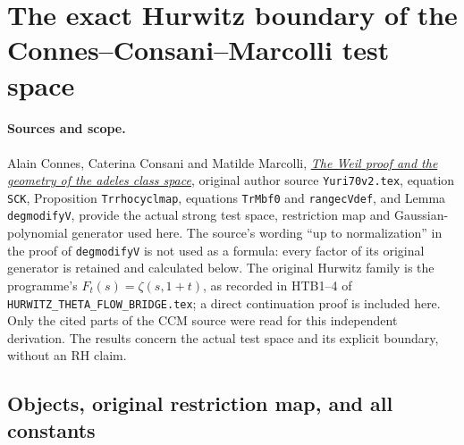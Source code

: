 \section{The exact Hurwitz boundary of the Connes--Consani--Marcolli test space}
\label{sec:hurwitz-cc-test-space-boundary}

\paragraph{Sources and scope.}
Alain Connes, Caterina Consani and Matilde Marcolli,
\href{https://arxiv.org/abs/math/0703392}{\emph{The Weil proof and the
geometry of the adeles class space}}, original author source
\nolinkurl{Yuri70v2.tex}, equation \texttt{SCK}, Proposition
\texttt{Trrhocyclmap}, equations \texttt{TrMbf0} and
\texttt{rangecVdef}, and Lemma \texttt{degmodifyV}, provide the actual
strong test space, restriction map and Gaussian-polynomial generator
used here. The source's wording ``up to normalization'' in the proof
of \texttt{degmodifyV} is not used as a formula: every factor of its
original generator is retained and calculated below. The original
Hurwitz family is the programme's $F_t(s)=\zeta(s,1+t)$, as recorded
in HTB1--4 of \nolinkurl{HURWITZ_THETA_FLOW_BRIDGE.tex}; a direct
continuation proof is included here. Only the cited parts of the CCM
source were read for this independent derivation. The results concern
the actual test space and its explicit boundary, without an RH claim.

\subsection{Objects, original restriction map, and all constants}

